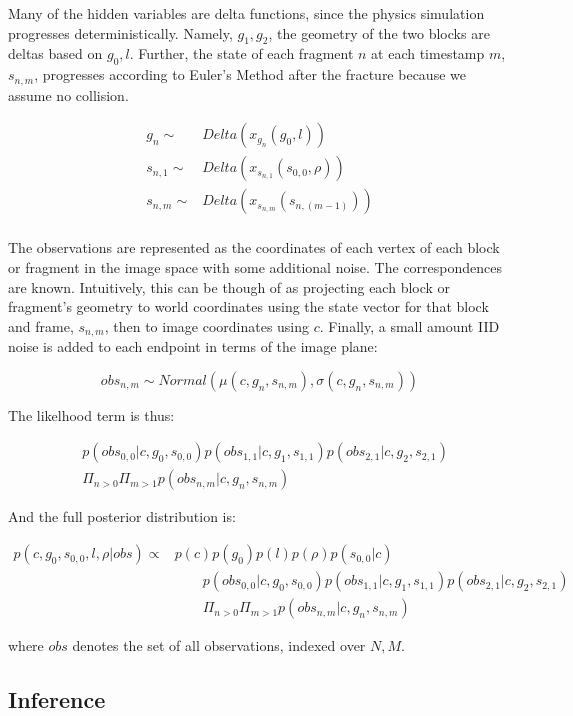 \documentclass[runningheads]{llncs}
\begin{document}
Many of the hidden variables are delta functions, since the physics simulation 
progresses deterministically. Namely, $g_1, g_2$, the geometry of the two blocks 
are deltas based on $g_0, l$. Further, the state of each fragment $n$ at each timestamp $m$, $s_{n,m}$, 
progresses according to Euler's Method after the fracture because we assume no 
collision.

\begin{align*}
g_n \sim& Delta(x_{g_n}(g_0, l)) \\
s_{n,1} \sim& Delta(x_{s_{n,1}}(s_{0,0}, \rho)) \\
s_{n,m} \sim& Delta(x_{s_{n,m}}(s_{n,(m-1)})) \\
\end{align*}

The observations are represented as the coordinates of each vertex of each 
block or fragment in the image space with some additional noise. The 
correspondences are known. Intuitively, this can be though of as 
projecting each block or fragment's geometry to world coordinates using the 
state vector for that block and frame, $s_{n,m}$, then to image 
coordinates using $c$. Finally, a small amount IID noise is added to each endpoint in terms of 
the image plane:


$$
obs_{n,m} \sim Normal(\mu(c, g_n, s_{n,m}), \sigma(c, g_n, s_{n,m}))
$$

The likelhood term is thus:

\begin{align*}
& p(obs_{0,0}|c, g_0, s_{0,0}) p(obs_{1,1}|c, g_1, s_{1,1}) p(obs_{2,1}|c, g_2, s_{2,1}) \\
& \Pi_{n > 0} \Pi_{m > 1} p(obs_{n,m} | c, g_n, s_{n,m})
\end{align*}

And the full posterior distribution is:

\begin{align*}
p(c, g_0, s_{0,0}, l, \rho | obs) \propto& p(c)p(g_0)p(l)p(\rho)p(s_{0,0}|c)  \\
                                         & \qquad p(obs_{0,0}|c, g_0, s_{0,0}) p(obs_{1,1}|c, g_1, s_{1,1}) p(obs_{2,1}|c, g_2, s_{2,1}) \\
                                         & \qquad \Pi_{n > 0} \Pi_{m > 1} p(obs_{n,m} | c, g_n, s_{n,m})
\end{align*}

where $obs$ denotes the set of all observations, indexed over $N, M$.

\subsection{Inference}
\label{inference}
\end{document}
